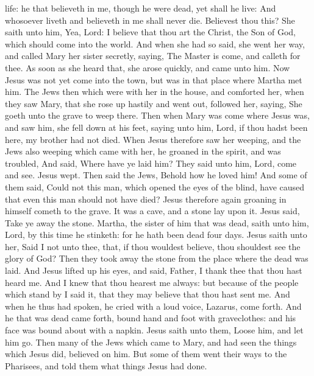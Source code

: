 life: he that believeth in me, though he were dead, yet shall he live:
 And whosoever liveth and believeth in me shall never
die. Believest thou this?  She saith unto him, Yea, Lord:
I believe that thou art the Christ, the Son of God, which should come
into the world.  And when she had so said, she went her
way, and called Mary her sister secretly, saying, The Master is come,
and calleth for thee.  As soon as she heard that, she
arose quickly, and came unto him.  Now Jesus was not yet
come into the town, but was in that place where Martha met him.
 The Jews then which were with her in the house, and
comforted her, when they saw Mary, that she rose up hastily and went
out, followed her, saying, She goeth unto the grave to weep there.
 Then when Mary was come where Jesus was, and saw him,
she fell down at his feet, saying unto him, Lord, if thou hadst been
here, my brother had not died.  When Jesus therefore saw
her weeping, and the Jews also weeping which came with her, he groaned
in the spirit, and was troubled,  And said, Where have ye
laid him? They said unto him, Lord, come and see.  Jesus
wept.  Then said the Jews, Behold how he loved him!
 And some of them said, Could not this man, which opened
the eyes of the blind, have caused that even this man should not have
died?  Jesus therefore again groaning in himself cometh
to the grave. It was a cave, and a stone lay upon it. 
Jesus said, Take ye away the stone. Martha, the sister of him that was
dead, saith unto him, Lord, by this time he stinketh: for he hath been
dead four days.  Jesus saith unto her, Said I not unto
thee, that, if thou wouldest believe, thou shouldest see the glory of
God?  Then they took away the stone from the place where
the dead was laid. And Jesus lifted up his eyes, and said, Father, I
thank thee that thou hast heard me.  And I knew that thou
hearest me always: but because of the people which stand by I said it,
that they may believe that thou hast sent me.  And when
he thus had spoken, he cried with a loud voice, Lazarus, come forth.
 And he that was dead came forth, bound hand and foot
with graveclothes: and his face was bound about with a napkin. Jesus
saith unto them, Loose him, and let him go.  Then many of
the Jews which came to Mary, and had seen the things which Jesus did,
believed on him.  But some of them went their ways to the
Pharisees, and told them what things Jesus had done.

